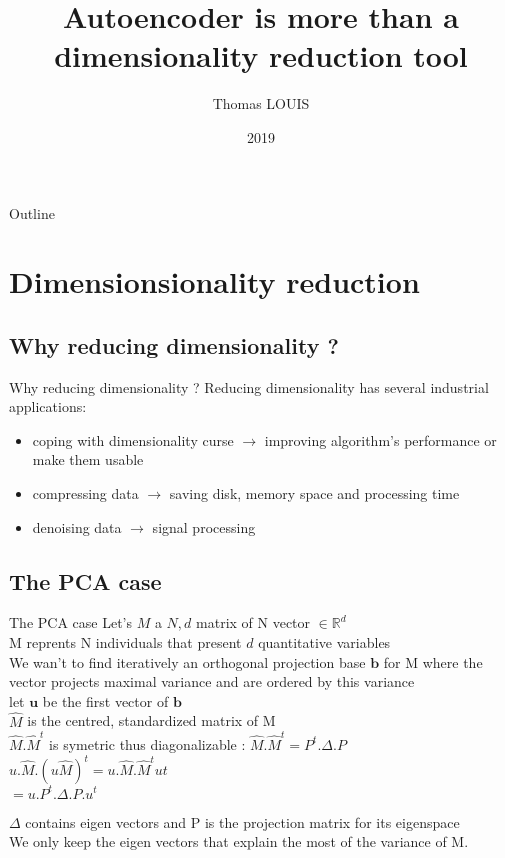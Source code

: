 \documentclass{beamer}
\title{Autoencoder is more than a dimensionality reduction tool}
\author{Thomas LOUIS}
\date{2019}
\newcommand{\reels}{\mathbb{R}}
\begin{document}
\begin{frame}
  \titlepage
\end{frame}

\begin{frame}[shrink=20]{Outline}
  \tableofcontents
\end{frame}

\section{Dimensionsionality reduction}

\subsection{Why reducing dimensionality ?}

\begin{frame}{Why reducing dimensionality ?}
    Reducing dimensionality has several industrial applications:
    \begin{itemize}
	    \item coping with dimensionality curse $\rightarrow$  improving algorithm's performance or make them usable
	    \item compressing data $\rightarrow$ saving disk, memory space and processing time 
	    \item denoising data $\rightarrow$ signal processing 
    \end{itemize}
\end{frame}

\subsection{The PCA case}
\begin{frame}{The PCA case}
    Let's $M$ a ${N, d}$ matrix  of N vector $\in \reels^{d}$\\
    M reprents N individuals that present $d$ quantitative variables \\
    We wan't to find iteratively an orthogonal projection base $\mathbf{b}$ for M where the vector projects maximal variance and are ordered by this variance \\
    let $\mathbf{u}$ be the first vector of $\mathbf{b}$ \\
    $\hat{M}$ is the centred, standardized matrix of M \\
    $\hat{M}.\hat{M}^{t}$ is symetric thus diagonalizable : $\hat{M}.\hat{M}^{t} = P^{t}.\Delta.P$ \\
    $u.\hat{M} . (u\hat{M})^{t} = u.\hat{M}.\hat{M}^{t}u{t}$ \\
    $ = u. P^{t}.\Delta.P. u^{t} $

    $\Delta$ contains eigen vectors and P is the projection matrix for its eigenspace \\

    We only keep the eigen vectors that explain the most of the variance of M. \\
\end{frame}
\end{document}
